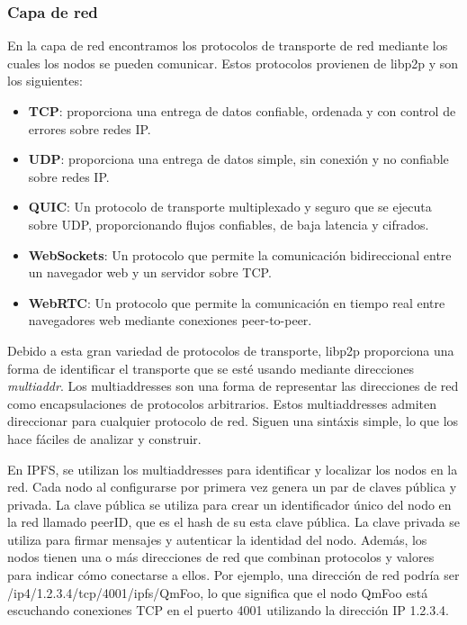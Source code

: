\subsubsection{Capa de red}
En la capa de red encontramos los protocolos de transporte de red mediante los cuales los nodos se pueden comunicar. Estos protocolos provienen de libp2p\cite{labsLibp2pConnectivity} y son los siguientes:
\begin{itemize}[itemsep=1pt,nolistsep]
      \item \textbf{TCP}: proporciona una entrega de datos confiable, ordenada y con control de errores sobre redes IP.
      \item \textbf{UDP}: proporciona una entrega de datos simple, sin conexión y no confiable sobre redes IP.
      \item \textbf{QUIC}: Un protocolo de transporte multiplexado y seguro que se ejecuta sobre UDP, proporcionando flujos confiables, de baja latencia y cifrados.
      \item \textbf{WebSockets}: Un protocolo que permite la comunicación bidireccional entre un navegador web y un servidor sobre TCP.
      \item \textbf{WebRTC}: Un protocolo que permite la comunicación en tiempo real entre navegadores web mediante conexiones peer-to-peer.
\end{itemize}

Debido a esta gran variedad de protocolos de transporte, libp2p proporciona una forma de identificar el transporte que se esté usando mediante
direcciones \textit{multiaddr}.
Los multiaddresses son una forma de representar las direcciones de red como encapsulaciones de protocolos arbitrarios. Estos multiaddresses admiten direccionar
para cualquier protocolo de red. Siguen una sintáxis  simple, lo que los hace fáciles de analizar y construir.

En IPFS, se utilizan los multiaddresses para identificar y localizar los nodos en la red. Cada nodo al configurarse por primera vez
genera un par de claves pública y privada. La clave pública se utiliza para crear un identificador único del nodo en la red llamado peerID, que es el hash de su esta clave pública. La clave privada se utiliza para firmar mensajes y autenticar la identidad del nodo. Además, los nodos tienen una o más direcciones de red que combinan protocolos y valores para indicar cómo conectarse a ellos. Por ejemplo, una dirección de red podría ser /ip4/1.2.3.4/tcp/4001/ipfs/QmFoo, lo que significa que el nodo QmFoo está escuchando conexiones TCP en el puerto 4001 utilizando la dirección IP 1.2.3.4.


